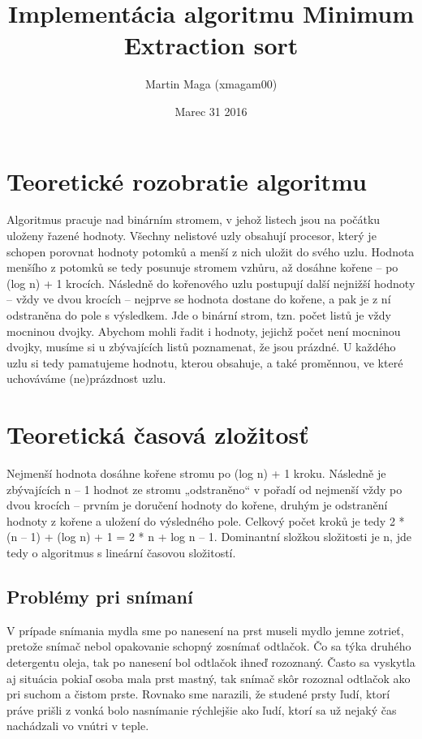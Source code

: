 \documentclass[12pt,a4paper,titlepage,final]{article}
\begin{document}

\def\projname{Projekt z predmetu PRL \\ Implementácie algoritmu Minimum extraction sort}



\title{Implementácia algoritmu Minimum Extraction sort}
\date{Marec 31 2016}
\author{Martin Maga (xmagam00)}
\maketitle

\section{Teoretické rozobratie algoritmu}
Algoritmus pracuje nad binárním stromem, v jehož listech jsou na počátku uloženy řazené hodnoty.
Všechny nelistové uzly obsahují procesor, který je schopen porovnat hodnoty potomků a menší z nich
uložit do svého uzlu. Hodnota menšího z potomků se tedy posunuje stromem vzhůru, až dosáhne
kořene – po (log n) + 1 krocích. Následně do kořenového uzlu postupují další nejnižší hodnoty – vždy
ve dvou krocích – nejprve se hodnota dostane do kořene, a pak je z ní odstraněna do pole
s výsledkem. Jde o binární strom, tzn. počet listů je vždy mocninou dvojky. Abychom mohli řadit i
hodnoty, jejichž počet není mocninou dvojky, musíme si u zbývajících listů poznamenat, že jsou
prázdné. U každého uzlu si tedy pamatujeme hodnotu, kterou obsahuje, a také proměnnou, ve které
uchováváme (ne)prázdnost uzlu.

\section{Teoretická časová zložitosť}
Nejmenší hodnota dosáhne kořene stromu po (log n) + 1 kroku. Následně je zbývajících n – 1 hodnot
ze stromu „odstraněno“ v pořadí od nejmenší vždy po dvou krocích – prvním je doručení hodnoty do
kořene, druhým je odstranění hodnoty z kořene a uložení do výsledného pole.
Celkový počet kroků je tedy 2 * (n – 1) + (log n) + 1 = 2 * n + log n – 1. Dominantní složkou složitosti je
n, jde tedy o algoritmus s lineární časovou složitostí.


\subsection{Problémy pri snímaní}
V prípade snímania mydla sme po nanesení na prst museli mydlo jemne zotrieť, pretože snímač nebol opakovanie schopný zosnímať odtlačok. Čo sa týka druhého detergentu oleja, tak po nanesení bol odtlačok ihneď rozoznaný. Často sa vyskytla aj situácia pokiaľ osoba mala prst mastný, tak snímač skôr rozoznal odtlačok ako pri suchom a čistom prste. Rovnako sme narazili, že studené prsty ľudí, ktorí práve prišli z vonká bolo nasnímanie rýchlejšie ako ľudí, ktorí sa už nejaký čas nachádzali vo vnútri v teple.
\end{document}
